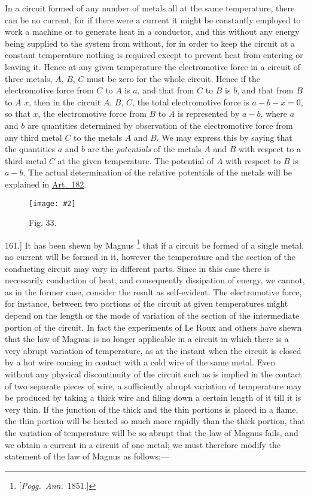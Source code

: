 \documentclass[12pt,oneside]{book}[2021/10/04]
\let\oldfootnote\footnote
\renewcommand\footnote[1]{%
\oldfootnote{\hspace{0.14em}#1}}
\newcommand{\Runhead}[1]{\fancyhead[C]{\iffloatpage{}{\small#1}}}
\newcommand{\article}[1]{\phantomsection \label{art:#1}{#1.]}}
\newcommand{\widefig}[3]{
\begin{figure}[ht!]
\centering
\texttt{[image: \#2]}
\caption*{\small #3}
\end{figure}}
\newcommand{\¬}{\hphantom{0}}
\begin{document}
In a circuit formed of any number of metals all at the same
temperature, there can be no current, for if there were a current
it might be constantly employed to work a machine or to generate
heat in a conductor, and this without any energy being supplied
to the system from without, for in order to keep the circuit at
a constant temperature nothing is required except to prevent heat
from entering or leaving it. Hence at any given temperature
the electromotive force in a circuit of three metals, \(A\), \(B\), \(C\) must
be zero for the whole circuit. Hence if the electromotive force
from \(C\) to \(A\) is \(a\), and that from \(C\) to \(B\) is \(b\), and that from \(B\) to \(A\)
\(x\), then in the circuit \(A\), \(B\), \(C\), the total electromotive force is
\(a - b - x = 0\), so that \(x\), the electromotive force from \(B\) to \(A\) is
represented by \(a - b\), where \(a\) and \(b\) are quantities determined by
observation of the electromotive force from any third metal \(C\)
to the metals \(A\) and \(B\). We may express this by saying that
the quantities \(a\) and \(b\) are the \textit{potentials} of the metals \(A\) and \(B\)
with respect to a third metal \(C\) at the given temperature. The
potential of \(A\) with respect to \(B\) is \(a - b\). The actual determination
of the relative potentials of the metals will be explained in
\hyperref[art:182]{Art.\ 182}.

\widefig{0.76}{148.png}{Fig. 33.}
\article{161} It has been shewn by Magnus\footnote{
[\textit{Pogg.\ Ann.}\ 1851.]} that if a circuit be formed
of a single metal, no current will be formed in it, however the
temperature and the section of the conducting circuit may vary
in different parts. Since in this case there is necessarily conduction
of heat, and consequently dissipation of energy, we cannot,
as in the former case, consider the result as self-evident. The
electromotive force, for instance, between two portions of the
circuit at given temperatures might depend on the length or
the mode of variation of the section of the intermediate portion
of the circuit. In fact the experiments of Le Roux and others
have shewn that the law of Magnus is no longer applicable in
a circuit in which there is a very abrupt variation of temperature,
as at the instant when the circuit is closed by a hot wire coming
in contact with a cold wire of the same metal. Even without
any physical discontinuity of the circuit such as is implied in
the contact of two separate pieces of wire, a sufficiently abrupt
variation of temperature may be produced by taking a thick
wire and filing down a certain length of it till it is very thin.
If the junction of the thick and the thin portions is placed in
a flame, the thin portion will be heated so much more rapidly
than the thick portion, that the variation of temperature will be
so abrupt that the law of Magnus fails, and we obtain a current
in a circuit of one metal; we must therefore modify the statement
of the law of Magnus as follows:---
\Runhead{LAW OF MAGNUS.}
\end{document}
